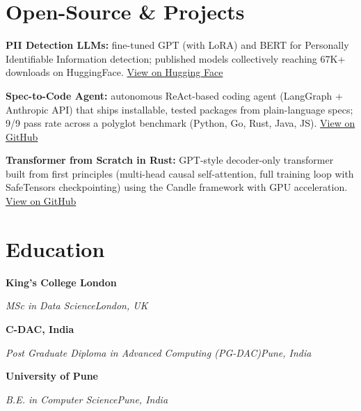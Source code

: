 \documentclass[10pt,a4paper]{article}
\newcommand{\entry}[4]{%
  {\color{company}\bfseries #1}\hfill {\color{muted}#2}\par
  \vspace{1pt}
  {\itshape #3}\hfill {\color{muted}\itshape #4}\par
  \vspace{3pt}%
}
\begin{document}
\section{Open-Source \& Projects}
\begin{tight}
  \item \textbf{PII Detection LLMs:} fine-tuned GPT (with LoRA) and BERT for Personally Identifiable Information detection; published models collectively reaching 67K+ downloads on HuggingFace. \href{https://huggingface.co/ab-ai/pii_model}{View on Hugging Face}
  \item \textbf{Spec-to-Code Agent:} autonomous ReAct-based coding agent (LangGraph + Anthropic API) that ships installable, tested packages from plain-language specs; 9/9 pass rate across a polyglot benchmark (Python, Go, Rust, Java, JS). \href{https://github.com/abhijeetscode/Spec-to-Code-Agent}{View on GitHub}
  \item \textbf{Transformer from Scratch in Rust:} GPT-style decoder-only transformer built from first principles (multi-head causal self-attention, full training loop with SafeTensors checkpointing) using the Candle framework with GPU acceleration. \href{https://github.com/abhijeetscode/transformer-rust}{View on GitHub}
\end{tight}

\section{Education}
\entry{King's College London}{}{MSc in Data Science}{London, UK}
\vspace{-3pt}
\entry{C-DAC, India}{}{Post Graduate Diploma in Advanced Computing (PG-DAC)}{Pune, India}
\vspace{-3pt}
\entry{University of Pune}{}{B.E. in Computer Science}{Pune, India}
\end{document}

